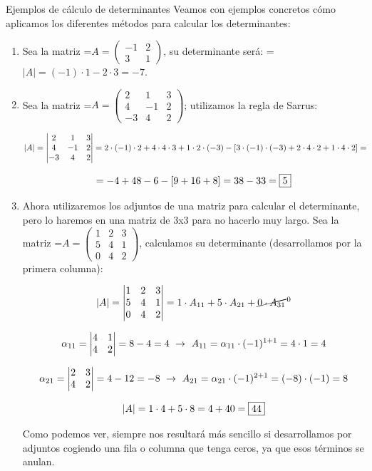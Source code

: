 \documentclass[11pt,a4paper]{article}
\newcommand{\fmm}[1]{\setbox0=\hbox{$#1$}\ifdim\wd0>\linewidth\fmdisp{#1}\else\mbox{\box0}\fi}
\newcommand{\fmdisp}[1]{\[\setbox2=\hbox{$\displaystyle #1$}\ifdim\wd2>\linewidth\resizebox{\linewidth}{!}{\box2}\else\box2\fi\]}
\begin{document}
\begin{fmex}{Ejemplos de cálculo de determinantes}
Veamos con ejemplos concretos cómo aplicamos los diferentes métodos para calcular los determinantes:

\begin{enumerate}[label=\textbf{\arabic*.},leftmargin=*]
\item Sea la matriz \fmm{A=\begin{pmatrix}-1 & 2\\ 3 & 1\end{pmatrix}}, su determinante será: \fmm{|A|=(-1)\cdot1-2\cdot3=-7}.
\item Sea la matriz \fmm{A=\begin{pmatrix}2 & 1 & 3\\ 4 & -1 & 2\\ -3 & 4 & 2\end{pmatrix}}; utilizamos la regla de Sarrus:

\fmdisp{|A|=\begin{vmatrix}2 & 1 & 3\\ 4 & -1 & 2\\ -3 & 4 & 2\end{vmatrix}=2\cdot(-1)\cdot2+4\cdot4\cdot3+1\cdot2\cdot(-3)-[3\cdot(-1)\cdot(-3)+2\cdot4\cdot2+1\cdot4\cdot2]=}

\fmdisp{=-4+48-6-[9+16+8]=38-33=\boxed{5}}

\item Ahora utilizaremos los adjuntos de una matriz para calcular el determinante, pero lo haremos en una matriz de 3x3 para no hacerlo muy largo.\newline
          Sea la matriz \fmm{A=\begin{pmatrix}1 & 2 & 3\\ 5 & 4 & 1\\ 0 & 4 & 2\end{pmatrix}}, calculamos su determinante (desarrollamos por la primera columna):

\fmdisp{|A|=\begin{vmatrix}1 & 2 & 3\\ 5 & 4 & 1\\ 0 & 4 & 2\end{vmatrix}=1\cdot A_{11}+5\cdot A_{21}+\cancel{0\cdot A_{31}}^{\,0}}

\fmdisp{\alpha_{11}=\begin{vmatrix}4 & 1\\ 4 & 2\end{vmatrix}=8-4=4\ \rightarrow\ A_{11}=\alpha_{11}\cdot(-1)^{1+1}=4\cdot1=4}

\fmdisp{\alpha_{21}=\begin{vmatrix}2 & 3\\ 4 & 2\end{vmatrix}=4-12=-8\ \rightarrow\ A_{21}=\alpha_{21}\cdot(-1)^{2+1}=(-8)\cdot(-1)=8}

\fmdisp{|A|=1\cdot4+5\cdot8=4+40=\boxed{44}}

Como podemos ver, siempre nos resultará más sencillo si desarrollamos por adjuntos cogiendo una fila o columna que tenga ceros, ya que esos términos se anulan.
\end{enumerate}
\end{fmex}
\end{document}
